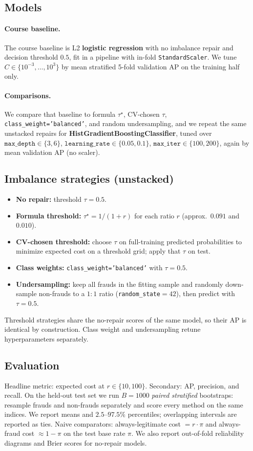 \documentclass[10pt,twocolumn,letterpaper]{article}
\begin{document}
\subsection{Models}
\paragraph{Course baseline.}
The course baseline is L2 \textbf{logistic regression} with no imbalance repair and decision threshold $0.5$, fit in a pipeline with in-fold \texttt{StandardScaler}.
We tune $C\in\{10^{-3},\ldots,10^{3}\}$ by mean stratified 5-fold validation AP on the training half only.
\paragraph{Comparisons.}
We compare that baseline to formula $\tau^{\star}$, CV-chosen $\tau$, \texttt{class\_weight='balanced'}, and random undersampling, and we repeat the same unstacked repairs for \textbf{HistGradientBoostingClassifier}, tuned over $\texttt{max\_depth}\in\{3,6\}$, $\texttt{learning\_rate}\in\{0.05,0.1\}$, $\texttt{max\_iter}\in\{100,200\}$, again by mean validation AP (no scaler).

\subsection{Imbalance strategies (unstacked)}
\begin{itemize}
  \item \textbf{No repair:} threshold $\tau{=}0.5$.
  \item \textbf{Formula threshold:} $\tau^{\star}=1/(1+r)$ for each ratio $r$ (approx.\ $0.091$ and $0.010$).
  \item \textbf{CV-chosen threshold:} choose $\tau$ on full-training predicted probabilities to minimize expected cost on a threshold grid; apply that $\tau$ on test.
  \item \textbf{Class weights:} \texttt{class\_weight='balanced'} with $\tau{=}0.5$.
  \item \textbf{Undersampling:} keep all frauds in the fitting sample and randomly down-sample non-frauds to a $1{:}1$ ratio (\texttt{random\_state}${}=42$), then predict with $\tau{=}0.5$.
\end{itemize}
Threshold strategies share the no-repair scores of the same model, so their AP is identical by construction.
Class weight and undersampling retune hyperparameters separately.

\subsection{Evaluation}
Headline metric: expected cost at $r\in\{10,100\}$.
Secondary: AP, precision, and recall.
On the held-out test set we run $B{=}1000$ \emph{paired stratified} bootstraps: resample frauds and non-frauds separately and score every method on the same indices.
We report means and $2.5$--$97.5\%$ percentiles; overlapping intervals are reported as ties.
Naive comparators: always-legitimate cost $=r\cdot\pi$ and always-fraud cost $\approx 1-\pi$ on the test base rate $\pi$.
We also report out-of-fold reliability diagrams and Brier scores for no-repair models.
\end{document}
